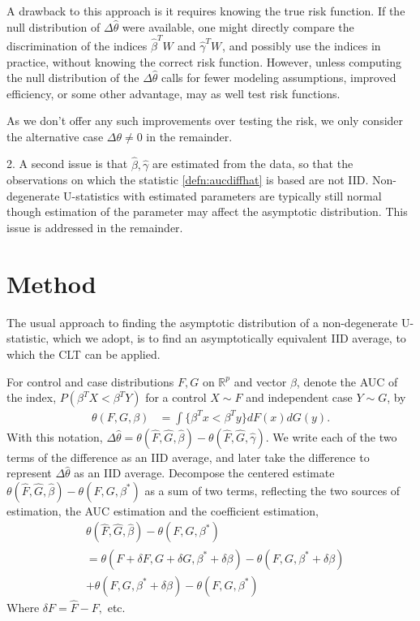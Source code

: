 \documentclass[12pt]{article}
\newcommand{\W}[1][]{W_{#1}}
\renewcommand{\t}[1]{{#1}^T}
\renewcommand{\star}[1]{{#1}^\ast}
\newcommand{\F}{F}
\newcommand{\G}{G}
\newcommand{\auc}{\theta}
\newcommand{\aucdiff}{\Delta\auc}
\newcommand{\aucdiffhat}{\Delta\hat{\auc}}
\newcommand{\kernel}[2]{\{#1 < #2\}}
\theoremstyle{definition}
\begin{document}
A drawback to this approach is it requires knowing the true risk
function. If the null distribution of $\aucdiffhat$ were available,
one might directly compare the discrimination of the indices
$\t{\hat\beta} \W$ and $\t{\hat\gamma} \W$, and possibly use the
indices in practice, without knowing the correct risk
function. However, unless computing the null distribution of the
$\aucdiffhat$ calls for fewer modeling assumptions, improved efficiency,
or some other advantage, may as well test risk functions.

As we don't offer any such improvements over testing the risk, we only consider
the alternative case $\aucdiff\neq 0$ in the remainder.

2. A second issue is that $\hat\beta,\hat\gamma$ are estimated from
the data, so that the observations on which the statistic \eqref{defn:aucdiffhat} is based
are not IID. Non-degenerate U-statistics with estimated parameters are
typically still normal though estimation of the parameter may affect
the asymptotic distribution. This issue is addressed in the remainder.


\section{Method}\label{section:method}


The usual approach to finding the asymptotic distribution of
a non-degenerate U-statistic, which we adopt, is to find an asymptotically equivalent IID average, to which
the CLT can be applied.


For control and case distributions $F,G$ on $\mathbb{R}^p$ and vector $\beta$, denote the AUC of the index, $P(\t\beta X < \t\beta Y)$ for a control $X\sim F$ and independent case $Y\sim G$, by
\begin{align}
  \auc(F,G,\beta) &= \int\kernel{\t\beta x}{\t\beta y}dF(x)dG(y).
\end{align}
With this notation,
$\aucdiffhat=\auc(\hat\F,\hat\G,\hat\beta)-\auc(\hat\F,\hat\G,\hat\gamma)$.
We write each of the two terms of the difference as an IID average, and later take the difference to
represent $\aucdiffhat$ as an IID average. Decompose the centered estimate
$\auc(\hat\F,\hat\G,\hat\beta)- \auc(\F,\G,\star\beta)$ as a sum of two
terms, reflecting the two sources of estimation, the AUC estimation
and the coefficient
estimation,%
\begin{align}
  &\auc(\hat\F,\hat\G,\hat\beta) - \auc(\F,\G,\star\beta)\\
  &=\auc(\F+\delta\F,\G+\delta\G,\star\beta+\delta\beta) - \auc(\F,\G,\star\beta+\delta\beta) \label{method:delong term}\\
    &+ \auc(\F,\G,\star\beta+\delta\beta)-\auc(\F,\G,\star\beta)\label{method:adjustment term}
\end{align}
Where $\delta\F=\hat\F-\F,$ etc.
\end{document}
